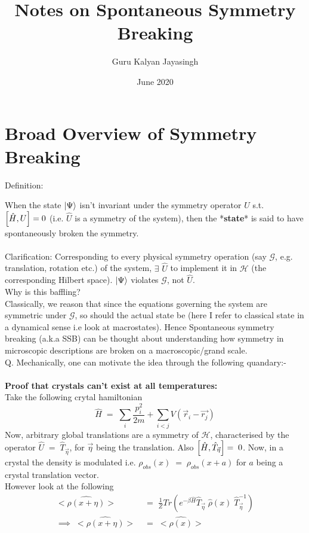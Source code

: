 \documentclass[12pt]{article}
\title{\Huge{Notes on Spontaneous Symmetry Breaking}}
\author{\Large{Guru Kalyan Jayasingh}}
\date{\Large{June 2020}}
\begin{document}
\maketitle




\large
\section{Broad Overview of Symmetry Breaking}
Definition:

When the state $\ket{\Psi}$ isn't invariant under the symmetry operator $\hat{U}$
s.t. $\comm{\hat{H}}{U}=0$ (i.e. $\hat{U}$ is a symmetry of the system), then the *\textbf{state}* is said to have spontaneously broken the symmetry.\\
\\
Clarification: Corresponding to every physical symmetry operation (say $\mathcal{G}$, e.g. translation, rotation etc.) of the system, $\exists$ $\hat{U}$ to implement it in $\mathscr{H}$ (the corresponding Hilbert space). $\ket{\Psi}$ violates $\mathcal{G}$, not $\hat{U}$. \\
\newline
Why is this baffling?\\
Classically, we reason that since the equations governing the system are symmetric under $\mathcal{G}$, so should the actual state be (here I refer to classical state in a dynamical sense i.e look at macrostates). Hence Spontaneous symmetry breaking (a.k.a SSB) can be thought about understanding how symmetry in microscopic descriptions are broken on a macroscopic/grand scale.\\
Q. Mechanically, one can motivate the idea through the following quandary:-\\
\\
\textbf{Proof that crystals can't exist at all temperatures:}\\
Take the following crytal hamiltonian
$$\hat{H}\;=\;\sum_i \frac{p_i^2}{2m}+\sum_{i<j}V(\Vec{r}_i-\Vec{r_j})$$
Now, arbitrary global translations are a symmetry of $\mathcal{H}$, characterised by the operator $\hat{U}\;=\;\hat{T}_{\Vec{\eta}}$, for $\Vec{\eta}$ being the translation. Also $\comm{\hat{H}}{\hat{T}_{\Vec{\eta}}}=\;0$. Now, in a crystal the density is modulated i.e. $\rho_{obs}(x)\;=\;\rho_{obs}(x+a)$ for $a$ being a crystal translation vector.\\
However look at the following
\begin{align*}
    <\hat{\rho(x+\eta)}> &= \;\frac{1}{Z}Tr(e^{-\beta \hat{H}}\hat{T}_{\Vec{\eta}}\;\hat{\rho}(x)\;\hat{T}^{-1}_{\Vec{\eta}} ) \\
    \implies\; <\hat{\rho(x+\eta)}>\;&=\; <\hat{\rho(x)}>
\end{align*}
\end{document}

